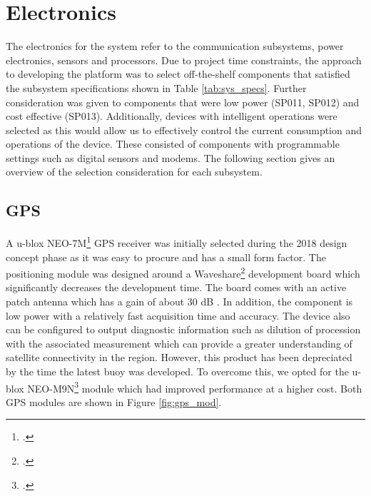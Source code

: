 \section{Electronics}

The electronics for the system refer to the communication subsystems, power electronics, sensors and processors. Due to project time constraints, the approach to developing the platform was to select off-the-shelf components that satisfied the subsystem specifications shown in Table \ref{tab:sys_specs}. Further consideration was given to components that were low power (SP011, SP012) and cost effective (SP013). Additionally, devices with intelligent operations were selected as this would allow us to effectively control the current consumption and operations of the device. These consisted of components with programmable settings such as digital sensors and modems. The following section gives an overview of the selection consideration for each subsystem.

\subsection{GPS}
\label{subsec:ch3_gps}
A u-blox NEO-7M\footcite{UBLOX_M7N_DATA} GPS receiver was initially selected during the 2018 design concept phase as it was easy to procure and has a small form factor. The positioning  module was designed around a Waveshare\footcite{waveshare} development board which significantly decreases the development time. The board comes with an active patch antenna which has a gain of about 30 dB \cite{waveshare}. In addition, the component is low power with a relatively fast acquisition time and accuracy. The device also can be configured to output diagnostic information such as dilution of procession with the associated measurement which can provide a greater understanding of satellite connectivity in the region. However,  this product has been depreciated by the time the latest buoy was developed. To overcome this, we opted for the u-blox NEO-M9N\footcite{UBLOX_M9N_DATA} module which had improved performance at a higher cost. Both GPS modules are shown in Figure \ref{fig:gps_mod}.

